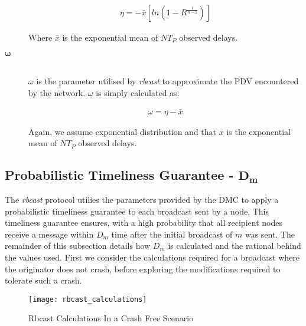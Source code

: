 \begin{description}
        \begin{equation*}
		    \begin{aligned}
		        \eta=-\bar{x}[ln(1-R^{\frac{1}{n-1}})]  
		    \end{aligned}
		\end{equation*}
		
Where $\bar{x}$ is the exponential mean of $NT_P$ observed delays.

        \item[\Huge$\boldsymbol{\omega}$] \hfill \\
        $\omega$ is the parameter utilised by \emph{rbcast} to approximate the PDV encountered by the network.  $\omega$ is simply calculated as:
        
        \begin{equation*}
		    \begin{aligned}
		        \omega = \eta - \bar{x}
		    \end{aligned}
		\end{equation*}        
        
        Again, we assume exponential distribution and that $\bar{x}$ is the exponential mean of $NT_P$ observed delays.
        \end{description}

        \subsection*{Probabilistic Timeliness Guarantee - $\boldsymbol{D_m}$}
        The \emph{rbcast} protocol utilies the parameters provided by the DMC to apply a probabilistic timeliness guarantee to each broadcast sent by a node.  This timeliness guarantee ensures, with a high probability that all recipient nodes receive a message within $D_m$ time after the initial broadcast of $m$ was sent.  The remainder of this subsection details how $D_m$ is calculated and the rational behind the values used.  First we consider the calculations required for a broadcast where the originator does not crash, before exploring the modifications required to tolerate such a crash.  

        \begin{figure}[hb]
                \centering    
                \centerline{\texttt{[image: rbcast\_calculations]}}
                \caption[Rbcast Calculations Diagram In a Crash Free Scenario]{Rbcast Calculations In a Crash Free Scenario}
                \label{fig:rbcast_calc}
            \end{figure}	

